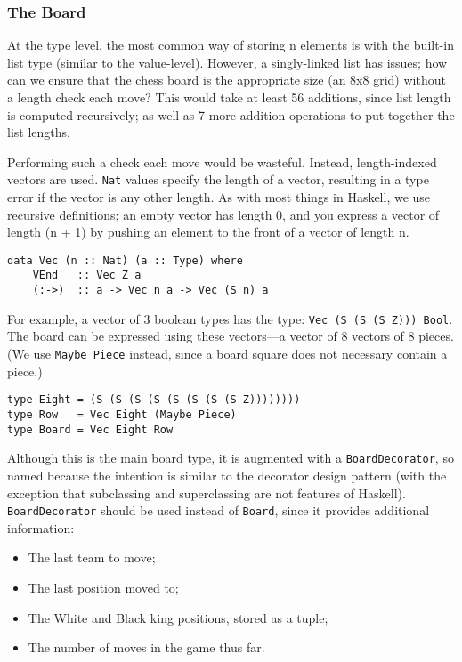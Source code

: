 \documentclass[12pt, a4paper, bibliography=totocnumbered]{scrartcl}
\begin{document}
\subsubsection{The Board}

At the type level, the most common way of storing n elements is with the built-in list type (similar to the value-level). However, a singly-linked list has issues; how can we ensure that the chess board is the appropriate size (an 8x8 grid) without a length check each move? This would take at least 56 additions, since list length is computed recursively; as well as 7 more addition operations to put together the list lengths.

Performing such a check each move would be wasteful. Instead, length-indexed vectors are used. \lstinline{Nat} values specify the length of a vector, resulting in a type error if the vector is any other length. As with most things in Haskell, we use recursive definitions; an empty vector has length 0, and you express a vector of length (n + 1) by pushing an element to the front of a vector of length n.

\begin{lstlisting}
data Vec (n :: Nat) (a :: Type) where
    VEnd   :: Vec Z a
    (:->)  :: a -> Vec n a -> Vec (S n) a
\end{lstlisting}

For example, a vector of 3 boolean types has the type: \lstinline{Vec (S (S (S Z))) Bool}. The board can be expressed using these vectors---a vector of 8 vectors of 8 pieces. (We use \lstinline{Maybe Piece} instead, since a board square does not necessary contain a piece.)

\begin{lstlisting}
type Eight = (S (S (S (S (S (S (S (S Z))))))))
type Row   = Vec Eight (Maybe Piece)
type Board = Vec Eight Row
\end{lstlisting}

Although this is the main board type, it is augmented with a \lstinline{BoardDecorator}, so named because the intention is similar to the decorator design pattern \cite{decorator} (with the exception that subclassing and superclassing are not features of Haskell). \lstinline{BoardDecorator} should be used instead of \lstinline{Board}, since it provides additional information:

\begin{itemize}
    \item The last team to move;
    \item The last position moved to;
    \item The White and Black king positions, stored as a tuple;
    \item The number of moves in the game thus far.
\end{itemize}
\end{document}

